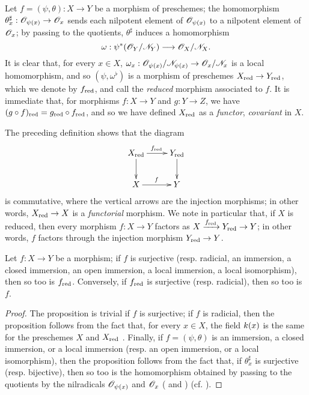 \begin{env}[5.1.5]
\label{1.5.1.5}
Let $f=(\psi,\theta):X\to Y$ be a morphism of preschemes;
the homomorphism $\theta_x^\sharp:\OO_{\psi(x)}\to\OO_x$ sends each nilpotent element of $\mathscr{O}_{\psi(x)}$ to a nilpotent element of $\mathscr{O}_x$;
by passing to the quotients, $\theta^\sharp$ induces a homomorphism
\[
  \omega:\psi^*(\OO_Y/\sh{N}_Y)\to\OO_X/\sh{N}_X.
\]
It is clear that, for every $x\in X$, $\omega_x:\OO_{\psi(x)}/\sh{N}_{\psi(x)}\to\OO_x/\sh{N}_x$ is a local homomorphism, and so $(\psi,\omega^\flat)$ is a morphism of preschemes $X_\red\to Y_\red$, which we denote by $f_{\mathrm{red}}$, and call the \emph{reduced} morphism associated to $f$.
It is immediate that, for morphisms $f:X\to Y$ and $g:Y\to Z$, we have $(g\circ f)_{\mathrm{red}}=g_{\mathrm{red}}\circ f_{\mathrm{red}}$, and so we have defined $X_{\mathrm{red}}$ as a \emph{functor}, \emph{covariant} in $X$.

The preceding definition shows that the diagram
\[
  \xymatrix{
    X_\red\ar[r]^{f_\red}\ar[d] &
    Y_\red\ar[d]\\
    X\ar[r]^f &
    Y
  }
\]
is commutative, where the vertical arrows are the injection morphisms;
in other words, $X_\red\to X$ is a \emph{functorial} morphism.
We note in particular that, if $X$ is reduced, then every morphism $f:X\to Y$ factors as $X\xrightarrow{f_\red}Y_\red\to Y$;
in other words, $f$ factors through the injection morphism $Y_\red\to Y$.
\end{env}

\begin{prop}[5.1.6]
\label{1.5.1.6}
Let $f:X\to Y$ be a morphism;
if $f$ is surjective (resp. radicial, an immersion, a closed immersion, an open immersion, a local immersion, a local isomorphism), then so too is $f_{\mathrm{red}}$.
Conversely, if $f_{\mathrm{red}}$ is surjective (resp. radicial), then so too is $f$.
\end{prop}

\begin{proof}
\label{proof-1.5.1.6}
The proposition is trivial if $f$ is surjective;
if $f$ is radicial, then the proposition follows from the fact that, for every $x\in X$, the field $k(x)$ is the same for the preschemes $X$ and $X_{\mathrm{red}}$ .
Finally, if $f=(\psi,\theta)$ is an immersion, a closed immersion, or a local immersion (resp. an open immersion, or a local isomorphism), then the proposition follows from the fact that, if $\theta_x^\sharp$ is surjective (resp. bijective), then so too is the homomorphism obtained by passing to the quotients by the nilradicals $\mathscr{O}_{\psi(x)}$ and $\mathscr{O}_x$ ( and ) (cf. ).
\end{proof}

